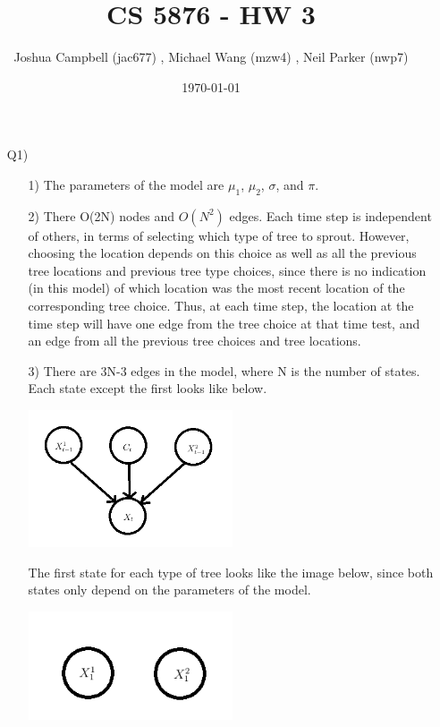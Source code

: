 \documentclass[12pt]{article}
\title{CS 5876 - HW 3}
\author{Joshua Campbell (jac677) , Michael Wang (mzw4) , Neil Parker (nwp7) }
\date{\today}
\begin{document}
\maketitle

\begin{enumerate}

\item[Q1)]
	
	\begin{enumerate}
	\item[1)] The parameters of the model are $\mu_1$, $\mu_2$, $\sigma$, and $\pi$.
	
	\item[2)] There O(2N) nodes and $O(N^2)$ edges. Each time step is independent of others, in terms of selecting which type of tree to sprout. However, choosing the location depends on this choice as well as all the previous tree locations and previous tree type choices, since there is no indication (in this model) of which location was the most recent location of the corresponding tree choice. Thus, at each time step, the location at the time step will have one edge from the tree choice at that time test, and an edge from all the previous tree choices and tree locations.
	
	\item[3)] There are 3N-3 edges in the model, where N is the number of states. Each state except the first looks like below.
		
	\includegraphics[width=0.5\textwidth]{Q1-3-1.png}
	
	The first state for each type of tree looks like the image below, since both states only depend on the parameters of the model.
	
	\includegraphics[width=0.5\textwidth]{Q1-3-2.png}
	

\end{enumerate}
\end{enumerate}
\end{document}
